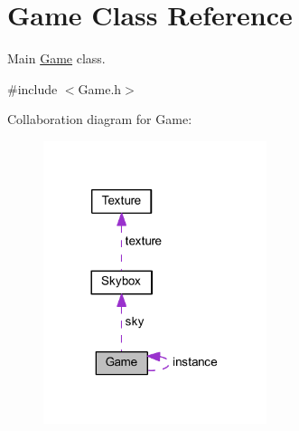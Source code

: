 \hypertarget{class_game}{}\section{Game Class Reference}
\label{class_game}


Main \mbox{\hyperlink{class_game}{Game}} class.  




{\ttfamily \#include $<$Game.\+h$>$}



Collaboration diagram for Game\+:\nopagebreak
\begin{figure}[H]
\begin{center}
\leavevmode
\includegraphics[width=185pt]{class_game__coll__graph}
\end{center}
\end{figure}
